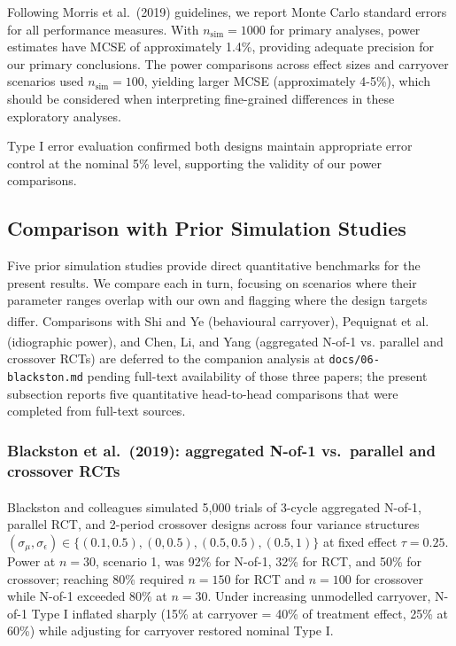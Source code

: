 \documentclass[
  11pt,
]{article}
\begin{document}
Following Morris et al.~(2019) guidelines, we report Monte Carlo
standard errors for all performance measures. With
\(n_{\text{sim}} = 1000\) for primary analyses, power estimates have
MCSE of approximately 1.4\%, providing adequate precision for our
primary conclusions. The power comparisons across effect sizes and
carryover scenarios used \(n_{\text{sim}} = 100\), yielding larger MCSE
(approximately 4-5\%), which should be considered when interpreting
fine-grained differences in these exploratory analyses.

Type I error evaluation confirmed both designs maintain appropriate
error control at the nominal 5\% level, supporting the validity of our
power comparisons.

\subsection{Comparison with Prior Simulation
Studies}\label{comparison-with-prior-simulation-studies}

Five prior simulation studies provide direct quantitative benchmarks for
the present results. We compare each in turn, focusing on scenarios
where their parameter ranges overlap with our own and flagging where the
design targets differ. Comparisons with Shi and
Ye\textsuperscript{}
(behavioural carryover), Pequignat et
al.\textsuperscript{}
(idiographic power), and Chen, Li, and
Yang\textsuperscript{}
(aggregated N-of-1 vs. parallel and crossover RCTs) are deferred to the
companion analysis at \texttt{docs/06-blackston.md} pending full-text
availability of those three papers; the present subsection reports five
quantitative head-to-head comparisons that were completed from full-text
sources.

\subsubsection{Blackston et al.~(2019): aggregated N-of-1 vs.~parallel
and crossover
RCTs}\label{blackston-et-al.-2019-aggregated-n-of-1-vs.-parallel-and-crossover-rcts}

Blackston and
colleagues\textsuperscript{}
simulated 5,000 trials of 3-cycle aggregated N-of-1, parallel RCT, and
2-period crossover designs across four variance structures
\((\sigma_\mu, \sigma_\epsilon) \in \{(0.1, 0.5),
(0, 0.5), (0.5, 0.5), (0.5, 1)\}\) at fixed effect \(\tau = 0.25\).
Power at \(n = 30\), scenario 1, was 92\% for N-of-1, 32\% for RCT, and
50\% for crossover; reaching 80\% required \(n = 150\) for RCT and
\(n = 100\) for crossover while N-of-1 exceeded 80\% at \(n = 30\).
Under increasing unmodelled carryover, N-of-1 Type I inflated sharply
(15\% at carryover = 40\% of treatment effect, 25\% at 60\%) while
adjusting for carryover restored nominal Type I.
\end{document}
